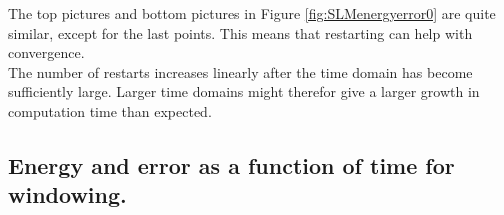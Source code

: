 \noindent The top pictures and bottom pictures in Figure \ref{fig:SLMenergyerror0} are quite similar, except for the last points. This means that restarting can help with convergence. \\ %

\noindent The number of restarts increases linearly after the time domain has become sufficiently large. Larger time domains might therefor give a larger growth in computation time than expected. \\
\subsection{Energy and error as a function of time for windowing.} %

